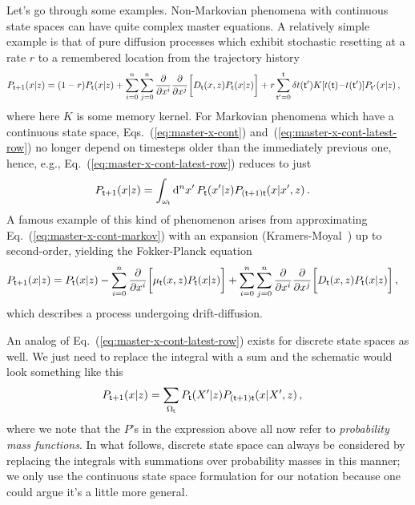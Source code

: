 Let's go through some examples. Non-Markovian phenomena with continuous state spaces can have quite complex master equations. A relatively simple example is that of pure diffusion processes which exhibit stochastic resetting at a rate $r$ to a remembered location from the trajectory history~\cite{boyer2017long}
\begin{align}
P_{{\sf t}+1}(x\vert z) &= (1-r)P_{{\sf t}}(x\vert z) + \sum_{i=0}^n\sum_{j=0}^n\frac{\partial}{\partial x^i}\frac{\partial}{\partial x^j}\bigg[ D_{{\sf t}}(x,z)P_{{\sf t}}(x\vert z) \bigg] + r\sum_{{\sf t}'=0}^{{\sf t}}\delta t ({\sf t}')K[t({\sf t}){-}t({\sf t}')]P_{{\sf t}'}(x\vert z) \,,
\end{align}
where here $K$ is some memory kernel. For Markovian phenomena which have a continuous state space, Eqs.~(\ref{eq:master-x-cont}) and~(\ref{eq:master-x-cont-latest-row}) no longer depend on timesteps older than the immediately previous one, hence, e.g., Eq.~(\ref{eq:master-x-cont-latest-row}) reduces to just
\begin{align}
P_{{\sf t}+1}(x\vert z) &= \int_{\omega_{\sf t}}{\rm d}^nx' \, P_{\sf t}(x'\vert z) P_{({\sf t}+1){\sf t}}(x\vert x',z) \label{eq:master-x-cont-markov} \,.
\end{align}
A famous example of this kind of phenomenon arises from approximating Eq.~(\ref{eq:master-x-cont-markov}) with an expansion (Kramers-Moyal~\cite{kramers1940brownian, moyal1949stochastic}) up to second-order, yielding the Fokker-Planck equation 
\begin{align}
P_{{\sf t}+1}(x\vert z) &= P_{{\sf t}}(x\vert z) - \sum_{i=0}^n\frac{\partial}{\partial x^i}\bigg[ \mu_{{\sf t}}(x,z)P_{{\sf t}}(x\vert z)\bigg] + \sum_{i=0}^n\sum_{j=0}^n\frac{\partial}{\partial x^i}\frac{\partial}{\partial x^j}\bigg[ D_{{\sf t}}(x,z)P_{{\sf t}}(x\vert z) \bigg] \,,
\end{align}
which describes a process undergoing drift-diffusion.

An analog of Eq.~(\ref{eq:master-x-cont-latest-row}) exists for discrete state spaces as well. We just need to replace the integral with a sum and the schematic would look something like this
\begin{align}
P_{{\sf t}+1}(x\vert z) &= \sum_{\Omega_{{\sf t}}} P_{{\sf t}}(X'\vert z) P_{({\sf t}+1){\sf t}}(x \vert X', z) \label{eq:master-x-disc} \,,
\end{align}
where we note that the $P$'s in the expression above all now refer to \emph{probability mass functions}. In what follows, discrete state space can always be considered by replacing the integrals with summations over probability masses in this manner; we only use the continuous state space formulation for our notation because one could argue it's a little more general. 

